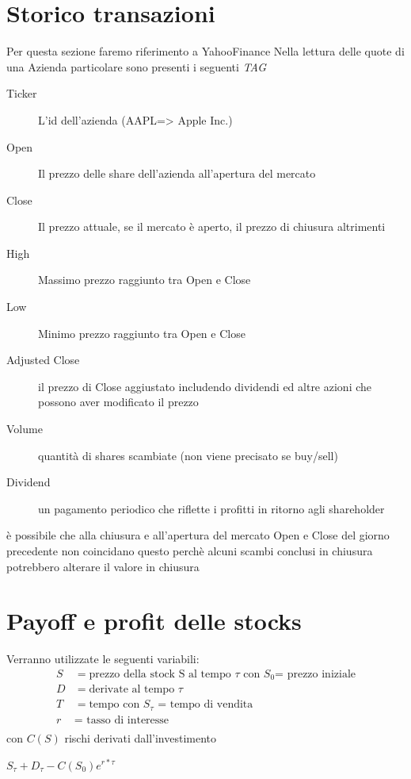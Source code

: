 \documentclass[a4paper,11pt]{report}
\begin{document}
{%

\section{Storico transazioni}
	{\tiny{Per questa sezione faremo riferimento a YahooFinance}} \newline
	Nella lettura delle quote di una Azienda particolare sono presenti i seguenti \emph{TAG} \newline
\begin{description}
	\item[Ticker] L'id dell'azienda (AAPL=> Apple Inc.)
	\item[Open] Il prezzo delle share dell'azienda all'apertura del mercato
	\item[Close] Il prezzo attuale, se il mercato è aperto, il prezzo di chiusura altrimenti
	\item[High] Massimo prezzo raggiunto tra Open e Close
	\item[Low] Minimo prezzo raggiunto tra Open e Close
	\item[Adjusted Close] il prezzo di Close aggiustato includendo dividendi ed altre azioni che possono aver modificato il prezzo
	\item[Volume] quantità di shares scambiate (non viene precisato se buy/sell)
	\item[Dividend] un pagamento periodico che riflette i profitti in ritorno agli shareholder
\end{description}
	è possibile che alla chiusura e all'apertura del mercato Open e Close del giorno precedente non coincidano \newline
	questo perchè alcuni scambi conclusi in chiusura potrebbero alterare il valore in chiusura %
\newpage


\section{Payoff e profit delle stocks}
	Verranno utilizzate le seguenti variabili:
\begin{align*} %
	S &= {\text {prezzo della stock S al tempo $\tau$ con $S_0$= prezzo iniziale}}\\
	D&= {\text {derivate al tempo $\tau$ }}\\
	T &= {\text {tempo con $S_\tau$ = tempo di vendita}}\\
	r &= {\text { tasso di interesse}}\\
\end{align*}
	con $C(S)$ rischi derivati dall'investimento
\begin{center}
	$S_\tau + D_\tau - C(S_0)e^{r*\tau}$
\end{center}
}
\end{document}
